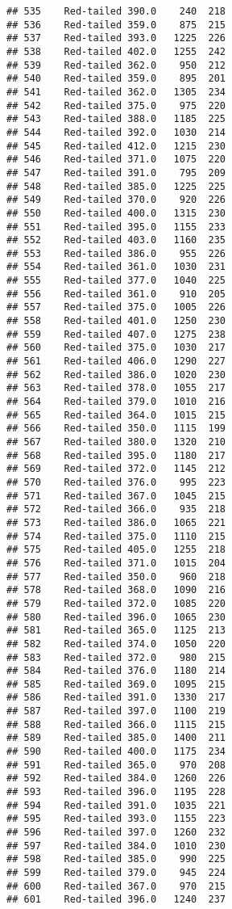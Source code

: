 \documentclass[
]{article}
\begin{document}
\begin{verbatim}
## 535    Red-tailed 390.0    240  218
## 536    Red-tailed 359.0    875  215
## 537    Red-tailed 393.0   1225  226
## 538    Red-tailed 402.0   1255  242
## 539    Red-tailed 362.0    950  212
## 540    Red-tailed 359.0    895  201
## 541    Red-tailed 362.0   1305  234
## 542    Red-tailed 375.0    975  220
## 543    Red-tailed 388.0   1185  225
## 544    Red-tailed 392.0   1030  214
## 545    Red-tailed 412.0   1215  230
## 546    Red-tailed 371.0   1075  220
## 547    Red-tailed 391.0    795  209
## 548    Red-tailed 385.0   1225  225
## 549    Red-tailed 370.0    920  226
## 550    Red-tailed 400.0   1315  230
## 551    Red-tailed 395.0   1155  233
## 552    Red-tailed 403.0   1160  235
## 553    Red-tailed 386.0    955  226
## 554    Red-tailed 361.0   1030  231
## 555    Red-tailed 377.0   1040  225
## 556    Red-tailed 361.0    910  205
## 557    Red-tailed 375.0   1005  226
## 558    Red-tailed 401.0   1250  230
## 559    Red-tailed 407.0   1275  238
## 560    Red-tailed 375.0   1030  217
## 561    Red-tailed 406.0   1290  227
## 562    Red-tailed 386.0   1020  230
## 563    Red-tailed 378.0   1055  217
## 564    Red-tailed 379.0   1010  216
## 565    Red-tailed 364.0   1015  215
## 566    Red-tailed 350.0   1115  199
## 567    Red-tailed 380.0   1320  210
## 568    Red-tailed 395.0   1180  217
## 569    Red-tailed 372.0   1145  212
## 570    Red-tailed 376.0    995  223
## 571    Red-tailed 367.0   1045  215
## 572    Red-tailed 366.0    935  218
## 573    Red-tailed 386.0   1065  221
## 574    Red-tailed 375.0   1110  215
## 575    Red-tailed 405.0   1255  218
## 576    Red-tailed 371.0   1015  204
## 577    Red-tailed 350.0    960  218
## 578    Red-tailed 368.0   1090  216
## 579    Red-tailed 372.0   1085  220
## 580    Red-tailed 396.0   1065  230
## 581    Red-tailed 365.0   1125  213
## 582    Red-tailed 374.0   1050  220
## 583    Red-tailed 372.0    980  215
## 584    Red-tailed 376.0   1180  214
## 585    Red-tailed 369.0   1095  215
## 586    Red-tailed 391.0   1330  217
## 587    Red-tailed 397.0   1100  219
## 588    Red-tailed 366.0   1115  215
## 589    Red-tailed 385.0   1400  211
## 590    Red-tailed 400.0   1175  234
## 591    Red-tailed 365.0    970  208
## 592    Red-tailed 384.0   1260  226
## 593    Red-tailed 396.0   1195  228
## 594    Red-tailed 391.0   1035  221
## 595    Red-tailed 393.0   1155  223
## 596    Red-tailed 397.0   1260  232
## 597    Red-tailed 384.0   1010  230
## 598    Red-tailed 385.0    990  225
## 599    Red-tailed 379.0    945  224
## 600    Red-tailed 367.0    970  215
## 601    Red-tailed 396.0   1240  237

\end{verbatim}
\end{document}

